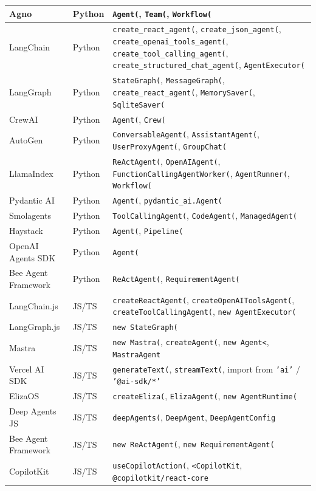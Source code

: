 {\begin{longtable}{@{}p{}p{}p{}@{}}
Agno & Python & \texttt{Agent(}, \texttt{Team(}, \texttt{Workflow(} \\ \midrule
LangChain & Python & \texttt{create\_react\_agent(}, \texttt{create\_json\_agent(}, \texttt{create\_openai\_tools\_agent(}, \texttt{create\_tool\_calling\_agent(}, \texttt{create\_structured\_chat\_agent(}, \texttt{AgentExecutor(} \\ \midrule
LangGraph & Python & \texttt{StateGraph(}, \texttt{MessageGraph(}, \texttt{create\_react\_agent(}, \texttt{MemorySaver(}, \texttt{SqliteSaver(} \\ \midrule
CrewAI & Python & \texttt{Agent(}, \texttt{Crew(} \\ \midrule
AutoGen & Python & \texttt{ConversableAgent(}, \texttt{AssistantAgent(}, \texttt{UserProxyAgent(}, \texttt{GroupChat(} \\ \midrule
LlamaIndex & Python & \texttt{ReActAgent(}, \texttt{OpenAIAgent(}, \texttt{FunctionCallingAgentWorker(}, \texttt{AgentRunner(}, \texttt{Workflow(} \\ \midrule
Pydantic AI & Python & \texttt{Agent(}, \texttt{pydantic\_ai.Agent(} \\ \midrule
Smolagents & Python & \texttt{ToolCallingAgent(}, \texttt{CodeAgent(}, \texttt{ManagedAgent(} \\ \midrule
Haystack & Python & \texttt{Agent(}, \texttt{Pipeline(} \\ \midrule
OpenAI Agents SDK & Python & \texttt{Agent(} \\ \midrule
Bee Agent Framework & Python & \texttt{ReActAgent(}, \texttt{RequirementAgent(} \\ \midrule
LangChain.js & JS/TS & \texttt{createReactAgent(}, \texttt{createOpenAIToolsAgent(}, \texttt{createToolCallingAgent(}, \texttt{new AgentExecutor(} \\ \midrule
LangGraph.js & JS/TS & \texttt{new StateGraph(} \\ \midrule
Mastra & JS/TS & \texttt{new Mastra(}, \texttt{createAgent(}, \texttt{new Agent\textless{}}, \texttt{MastraAgent} \\ \midrule
Vercel AI SDK & JS/TS & \texttt{generateText(}, \texttt{streamText(}, import from \texttt{'ai'} / \texttt{'@ai-sdk/*'} \\ \midrule
ElizaOS & JS/TS & \texttt{createEliza(}, \texttt{ElizaAgent(}, \texttt{new AgentRuntime(} \\ \midrule
Deep Agents JS & JS/TS & \texttt{deepAgents(}, \texttt{DeepAgent}, \texttt{DeepAgentConfig} \\ \midrule
Bee Agent Framework & JS/TS & \texttt{new ReActAgent(}, \texttt{new RequirementAgent(} \\ \midrule
CopilotKit & JS/TS & \texttt{useCopilotAction(}, \texttt{\textless{}CopilotKit}, \texttt{@copilotkit/react-core} \\ \midrule

\end{longtable}
}
